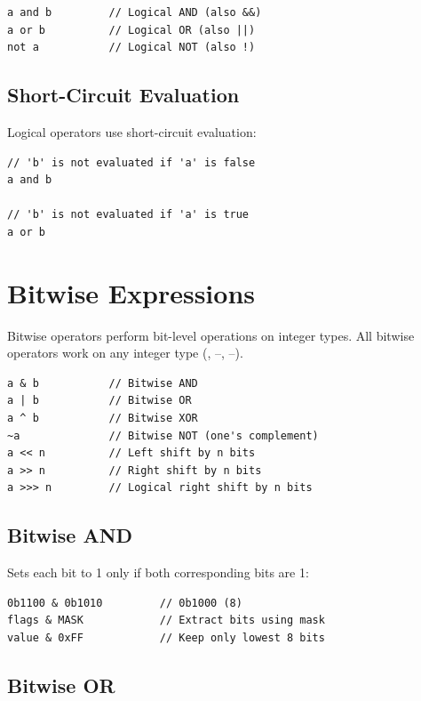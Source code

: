 \begin{lstlisting}
a and b         // Logical AND (also &&)
a or b          // Logical OR (also ||)
not a           // Logical NOT (also !)
\end{lstlisting}

\subsection{Short-Circuit Evaluation}

Logical operators use short-circuit evaluation:

\begin{lstlisting}
// 'b' is not evaluated if 'a' is false
a and b

// 'b' is not evaluated if 'a' is true
a or b
\end{lstlisting}

\section{Bitwise Expressions}

Bitwise operators perform bit-level operations on integer types. All bitwise operators work on any integer type (, --, --).

\begin{lstlisting}
a & b           // Bitwise AND
a | b           // Bitwise OR
a ^ b           // Bitwise XOR
~a              // Bitwise NOT (one's complement)
a << n          // Left shift by n bits
a >> n          // Right shift by n bits
a >>> n         // Logical right shift by n bits
\end{lstlisting}



\subsection{Bitwise AND}

Sets each bit to 1 only if both corresponding bits are 1:

\begin{lstlisting}
0b1100 & 0b1010         // 0b1000 (8)
flags & MASK            // Extract bits using mask
value & 0xFF            // Keep only lowest 8 bits
\end{lstlisting}

\subsection{Bitwise OR}

